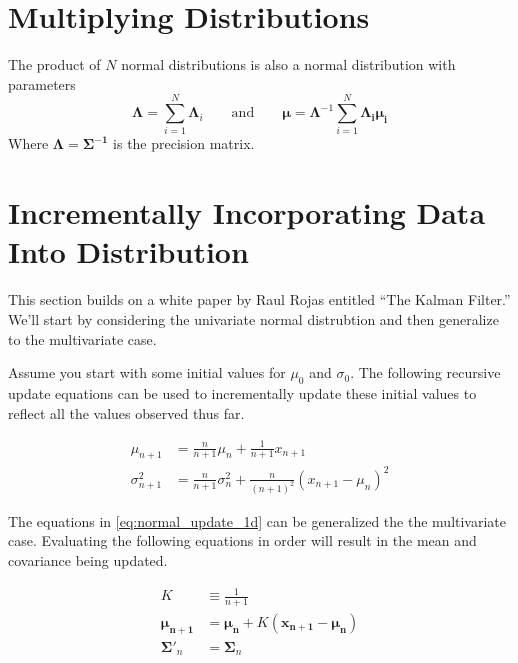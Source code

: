 \documentclass[../../main.tex]{subfiles}
\begin{document}
\section{Multiplying Distributions}
The product of $N$ normal distributions is also a normal distribution with
parameters
\begin{equation}
    \label{eq:sum_normal_mu_var}
    \boldsymbol\Lambda = \sum\limits_{i=1}^{N}\boldsymbol\Lambda_i
    \qquad\text{and}\qquad
    \boldsymbol\mu = \boldsymbol\Lambda^{-1}\sum\limits_{i=1}^{N}\boldsymbol{\Lambda_i\mu_i}
\end{equation}
Where $\boldsymbol{\Lambda} = \boldsymbol{\Sigma^{-1}}$ is the precision
matrix.


\section{Incrementally Incorporating Data Into Distribution}
This section builds on a white paper by Raul Rojas entitled ``The Kalman
Filter.''  We'll start by considering the univariate normal distrubtion
and then generalize to the multivariate case. 

Assume you start with some initial values for $\mu_0$ and $\sigma_0$.  The
following recursive update equations can be used to incrementally update these
initial values to reflect all the values observed thus far.

\begin{align}
    \label{eq:normal_update_1d}
    \mu_{n+1} &= \frac{n}{n + 1} \mu_n  + \frac{1}{n+1}x_{n+1} \\
    \sigma_{n+1}^2 &= \frac{n}{n + 1}\sigma_n^2
        + \frac{n}{(n+1)^2} \left( x_{n+1} - \mu_n \right) ^ 2\nonumber
\end{align}

The equations in \eqref{eq:normal_update_1d} can be generalized the the
multivariate case.  Evaluating the following equations in order will result in
the mean and covariance being updated.

\begin{align}
    \label{eq:normal_update_multi}
    K &\equiv \frac{1}{n + 1}\\
    \boldsymbol{\mu_{n+1}} &= \boldsymbol{\mu_{n}} +
                              K \left(
                                  \boldsymbol{x_{n+1}} - \boldsymbol{\mu_{n}}
                              \right) \nonumber\\
    {\boldsymbol{\Sigma}'}_{n} &= \boldsymbol{\Sigma}_{n}
\end{align}
 
\end{document}
